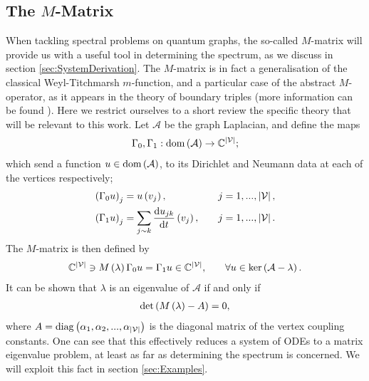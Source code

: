 \subsection{The $M$-Matrix} \label{ssec:MMatrix}
When tackling spectral problems on quantum graphs, the so-called $M$-matrix will provide us with a useful tool in determining the spectrum, as we discuss in section \ref{sec:SystemDerivation}.
The $M$-matrix is in fact a generalisation of the classical Weyl-Titchmarsh $m$-function, and a particular case of the abstract $M$-operator, as it appears in the theory of boundary triples (more information can be found ).
Here we restrict ourselves to a short review the specific theory that will be relevant to this work.
Let $\mathcal{A}$ be the graph Laplacian, and define the maps
\begin{align*}
	\Gamma_0, \Gamma_1: \mathrm{dom}\left( \mathcal{A} \right) \rightarrow \mathbb{C}^{\left\lvert \mathcal{V} \right\rvert};
\end{align*}
which send a function $u\in\mathrm{dom}\left( \mathcal{A} \right)$, to its Dirichlet and Neumann data at each of the vertices respectively;
\begin{align*}
	\left( \Gamma_0 u \right)_j &= u\left( v_j \right), \quad &j=1,...,\left\lvert \mathcal{V} \right\rvert, \\
	\left( \Gamma_1 u \right)_j &= \sum_{j\sim k}\dfrac{\mathrm{d}u_{jk}}{\mathrm{d}t}\left( v_j \right), \quad &j=1,...,\left\lvert \mathcal{V} \right\rvert. 
\end{align*}
The $M$-matrix is then defined by
\begin{align*}
	\mathbb{C}^{\left\lvert \mathcal{V} \right\rvert} \ni M\left( \lambda \right)\Gamma_0 u &= \Gamma_1 u \in \mathbb{C}^{\left\lvert \mathcal{V} \right\rvert},
	 &\quad \forall u\in\mathrm{ker}\left( \mathcal{A}-\lambda \right).
\end{align*}
It can be shown that $\lambda$ is an eigenvalue of $\mathcal{A}$ if and only if
\begin{align*}
	\mathrm{det}\left( M\left( \lambda \right) - A \right)= 0,
\end{align*}
where $A = \mathrm{diag}\left( \alpha_1, \alpha_2, ... , \alpha_{\left\lvert \mathcal{V} \right\rvert} \right)$ is the diagonal matrix of the vertex coupling constants.
One can see that this effectively reduces a system of ODEs to a matrix eigenvalue problem, at least as far as determining the spectrum is concerned.
We will exploit this fact in section \ref{sec:Examples}. \newline

